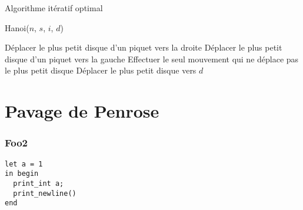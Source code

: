 \documentclass[usenames,dvipsnames,serif,14pt]{beamer}%
\begin{document}
\begin{frame}{Algorithme itératif optimal}
  \begin{algorithm}[H]
  \caption{Hanoi($n$, $s$, $i$, $d$)}
  {
      {Déplacer le plus petit disque d'un piquet vers la droite}
      {Déplacer le plus petit disque d'un piquet vers la gauche}
    Effectuer le seul mouvement qui ne déplace pas le plus petit disque
  }
  Déplacer le plus petit disque vers $d$
  \end{algorithm}
\end{frame}

\section{Pavage de Penrose}
\begin{frame}[fragile]%
\frametitle{Foo2}
\begin{verbatim}
let a = 1
in begin
  print_int a;
  print_newline()
end
\end{verbatim}
\end{frame}
\end{document}
